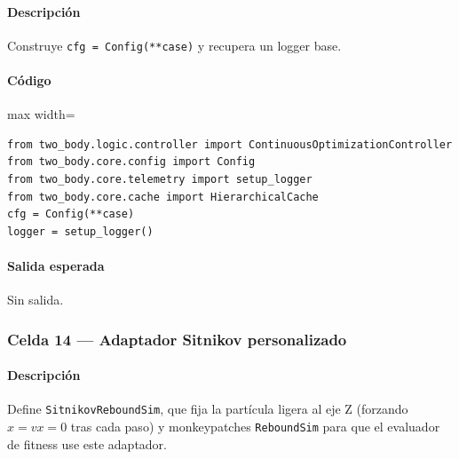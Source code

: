 \paragraph{Descripción} Construye \texttt{cfg = Config(**case)} y recupera un logger base. %
\paragraph{Código}
\begin{listing}[H]
\caption{Celda 12: creación de la configuración de trabajo}
\begin{adjustbox}{max width=\textwidth}
\begin{minipage}{\textwidth}
\begin{verbatim}
from two_body.logic.controller import ContinuousOptimizationController
from two_body.core.config import Config
from two_body.core.telemetry import setup_logger
from two_body.core.cache import HierarchicalCache
cfg = Config(**case)
logger = setup_logger()
\end{verbatim}
\end{minipage}
\end{adjustbox}
\end{listing}
\paragraph{Salida esperada} Sin salida.

\subsubsection*{Celda 14 — Adaptador Sitnikov personalizado}
\paragraph{Descripción} Define \texttt{SitnikovReboundSim}, que fija la partícula ligera al eje Z (forzando $x = vx = 0$ tras cada paso) y monkeypatches \texttt{ReboundSim} para que el evaluador de fitness use este adaptador.
